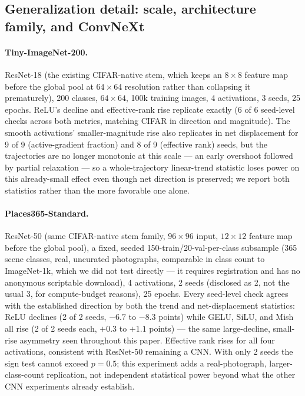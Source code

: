 \subsection{Generalization detail: scale, architecture family, and ConvNeXt}
\label{app:generalization-detail}

\paragraph{Tiny-ImageNet-200.} ResNet-18 (the existing CIFAR-native stem,
which keeps an $8\times8$ feature map before the global pool at
$64\times64$ resolution rather than collapsing it prematurely), 200
classes, $64\times64$, 100k training images, 4 activations, 3 seeds, 25
epochs. ReLU's decline and effective-rank rise replicate exactly (6 of 6
seed-level checks across both metrics, matching CIFAR in direction and
magnitude). The smooth activations' smaller-magnitude rise also replicates
in net displacement for 9 of 9 (active-gradient fraction) and 8 of 9
(effective rank) seeds, but the trajectories are no longer monotonic at
this scale --- an early overshoot followed by partial relaxation --- so a
whole-trajectory linear-trend statistic loses power on this already-small
effect even though net direction is preserved; we report both statistics
rather than the more favorable one alone.

\paragraph{Places365-Standard.} ResNet-50 (same CIFAR-native stem family,
$96\times96$ input, $12\times12$ feature map before the global pool), a
fixed, seeded 150-train/20-val-per-class subsample (365 scene classes,
real, uncurated photographs, comparable in class count to ImageNet-1k,
which we did not test directly --- it requires registration and has no
anonymous scriptable download), 4 activations, 2 seeds (disclosed as 2,
not the usual 3, for compute-budget reasons), 25 epochs. Every seed-level
check agrees with the established direction by both the trend and
net-displacement statistics: ReLU declines (2 of 2 seeds, $-6.7$ to
$-8.3$ points) while GELU, SiLU, and Mish all rise (2 of 2 seeds each,
$+0.3$ to $+1.1$ points) --- the same large-decline, small-rise asymmetry
seen throughout this paper. Effective rank rises for all four activations,
consistent with ResNet-50 remaining a CNN. With only 2 seeds the sign test
cannot exceed $p=0.5$; this experiment adds a real-photograph,
larger-class-count replication, not independent statistical power beyond
what the other CNN experiments already establish.

